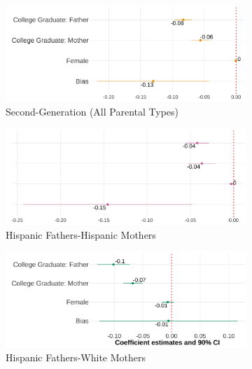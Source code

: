 \documentclass[12pt, fullpage]{article}
\begin{document}
\begin{center}
\begin{figure}[H]
\centering
\caption{Relationship Between Self-Reported Hispanic Identity and Bias: By Parental Types}
\label{plot01-regression-byparent}
\begin{subfigure}{.48\textwidth}
\caption{Second-Generation (All Parental Types)}
\centering
\includegraphics[width=.9\linewidth]{figure/by-parents-regs-all.png}
\end{subfigure}
\centering
\begin{subfigure}{.48\textwidth}
\caption{Hispanic Fathers-Hispanic Mothers}
\centering
\includegraphics[width=.9\linewidth]{figure/by-parents-regs-hh.png}
\end{subfigure}
\begin{subfigure}{.48\textwidth}
\caption{Hispanic Fathers-White Mothers}
\centering
\includegraphics[width=.9\linewidth]{figure/by-parents-regs-hw.png}
\end{subfigure}
\begin{subfigure}{.48\textwidth}

\end{subfigure}
\end{figure}
\end{center}
\end{document}
